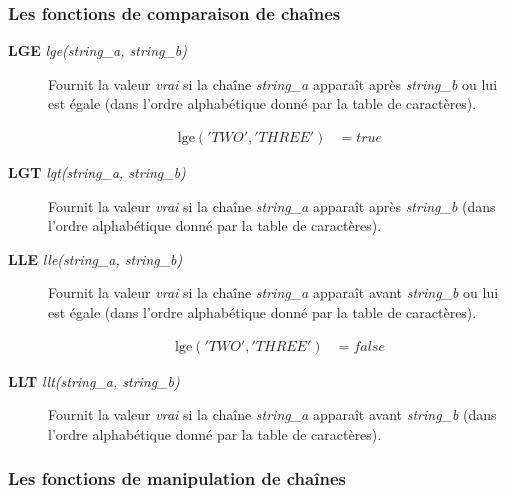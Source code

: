 \documentclass[a4paper,twoside]{article}
\begin{document}
\subsubsection{Les fonctions de comparaison de chaînes}

\begin{description}
    
\item[\textbf{LGE} \emph{lge(string\_a, string\_b)}] Fournit la valeur \emph{vrai} si la chaîne \emph{string\_a} apparaît après \emph{string\_b} ou lui est égale (dans l'ordre alphabétique donné par la table de caractères).
\begin{exemple}
\begin{align}
\mathrm{lge}('TWO','THREE')  &= true
\end{align}
\end{exemple}

\item[\textbf{LGT} \emph{lgt(string\_a, string\_b)}] Fournit la valeur \emph{vrai} si la chaîne \emph{string\_a}  apparaît après \emph{string\_b} (dans l'ordre alphabétique donné par la table de caractères).

\item[\textbf{LLE} \emph{lle(string\_a, string\_b)}] Fournit la valeur \emph{vrai} si la chaîne \emph{string\_a} apparaît avant \emph{string\_b} ou lui est égale (dans l'ordre alphabétique donné par la table de caractères).
\begin{exemple}
\begin{align}
\mathrm{lge}('TWO','THREE')  &= false
\end{align}
\end{exemple}

\item[\textbf{LLT} \emph{llt(string\_a, string\_b)}] Fournit la valeur \emph{vrai} si la chaîne \emph{string\_a}  apparaît avant \emph{string\_b} (dans l'ordre alphabétique donné par la table de caractères).

\end{description}


\subsubsection{Les fonctions de manipulation de chaînes}
\end{document}
